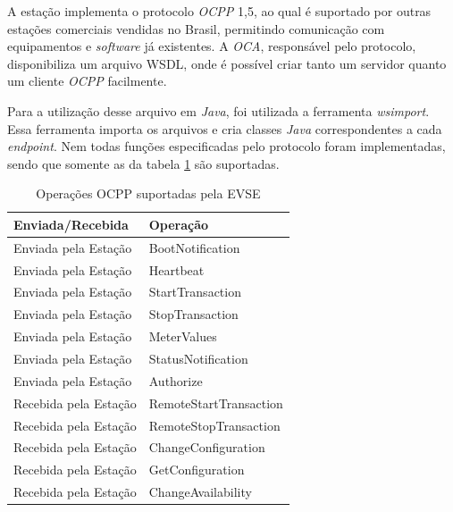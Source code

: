       A estação implementa o protocolo \textit{\ac{OCPP}} 1,5, ao qual é suportado por outras estações comerciais vendidas no Brasil, permitindo comunicação com equipamentos e \textit{software} já existentes. A \textit{\ac{OCA}}, responsável pelo protocolo, disponibiliza um arquivo WSDL, onde é possível criar tanto um servidor quanto um cliente \textit{\ac{OCPP}} facilmente.

      Para a utilização desse arquivo em \textit{Java}, foi utilizada a ferramenta \textit{wsimport}. Essa ferramenta importa os arquivos e cria classes \textit{Java} correspondentes a cada \textit{endpoint}. Nem todas funções especificadas pelo protocolo foram implementadas, sendo que somente as da tabela \ref{table:ocpp} são suportadas.

      \begin{table}[]
        \centering
        \caption{Operações OCPP suportadas pela EVSE}
        \label{table:ocpp}
        \begin{tabular}{@{}ll@{}}
          \toprule
          \textbf{Enviada/Recebida} & \textbf{Operação}      \\ \midrule
            Enviada pela Estação      & BootNotification       \\
            Enviada pela Estação      & Heartbeat              \\
            Enviada pela Estação      & StartTransaction       \\
            Enviada pela Estação      & StopTransaction        \\
            Enviada pela Estação      & MeterValues            \\
            Enviada pela Estação      & StatusNotification     \\
            Enviada pela Estação      & Authorize              \\
            Recebida pela Estação     & RemoteStartTransaction \\
            Recebida pela Estação     & RemoteStopTransaction  \\
            Recebida pela Estação     & ChangeConfiguration    \\
            Recebida pela Estação     & GetConfiguration       \\
            Recebida pela Estação     & ChangeAvailability     \\ \bottomrule
        \end{tabular}
      \end{table}

